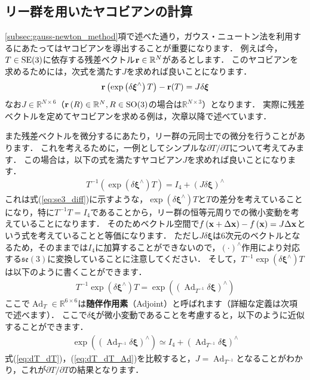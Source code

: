 \subsection{リー群を用いたヤコビアンの計算}

\ref{subsec:gauss-newton_method}項で述べた通り，ガウス・ニュートン法を利用するにあたってはヤコビアンを導出することが重要になります．
例えば今，$T \in {\rm SE}(3)$に依存する残差ベクトル${\bf r} \in \mathbb{R}^{N}$があるとします．
このヤコビアンを求めるためには，次式を満たす$J$を求めれば良いことになります．
%
\begin{align}
  {\bf r} \left( \exp \left( \delta \boldsymbol \xi^{\wedge} \right) T \right) - {\bf r}(T)
= J \delta \boldsymbol \xi
\end{align}
%
なお$J \in \mathbb{R}^{N \times 6}$（${\bf r}\left( R \right) \in \mathbb{R}^{N}, R \in {\rm SO}(3)$の場合は$\mathbb{R}^{N \times 3}$）となります．
実際に残差ベクトルを定めてヤコビアンを求める例は，次章以降で述べています．

また残差ベクトルを微分するにあたり，リー群の元同士での微分を行うことがあります．
これを考えるために，一例としてシンプルな$\partial T / \partial T$について考えてみます．
この場合は，以下の式を満たすヤコビアン$J$を求めれば良いことになります．
%
\begin{align}
  T^{-1} \left( \exp \left( \delta \boldsymbol \xi^{\wedge} \right) T \right) = I_{4} + \left( J \delta \boldsymbol \xi \right)^{\wedge}
  \label{eq:dT_dT}
\end{align}
%
これは式(\ref{eq:se3_diff})に示すような，$\exp \left( \delta \boldsymbol \xi^{\wedge} \right) T$と$T$の差分を考えていることになり，特に$T^{-1} T = I_{4}$であることから，リー群の恒等元周りでの微小変動を考えていることになります．
そのためベクトル空間で$f \left( {\bf x} + \Delta {\bf x} \right) - f \left( {\bf x} \right) = J \Delta {\bf x}$という式を考えていることと等価になります．
ただし$J \delta \boldsymbol \xi$は6次元のベクトルとなるため，そのままでは$I_{4}$に加算することができないので，$\left( \cdot \right)^{\wedge}$作用により対応する$\mathfrak{se}(3)$に変換していることに注意してください．
そして，$T^{-1} \exp \left( \delta \boldsymbol \xi^{\wedge} \right) T$は以下のように書くことができます．
%
\begin{align}
  T^{-1} \exp \left( \delta \boldsymbol \xi^{\wedge} \right) T = \exp \left( \left( \operatorname{Ad}_{T^{-1}} \delta \boldsymbol \xi \right)^{\wedge} \right)
\end{align}
%
ここで$\operatorname{Ad}_{T} \in \mathbb{R}^{6 \times 6}$は{\bf 随伴作用素}（Adjoint）と呼ばれます（詳細な定義は次項で述べます）．
ここで$\delta \boldsymbol \xi$が微小変動であることを考慮すると，以下のように近似することができます．
%
\begin{align}
  \exp \left( \left( \operatorname{Ad}_{T^{-1}} \delta \boldsymbol \xi \right)^{\wedge} \right) \simeq I_{4} + \left( \operatorname{Ad}_{T^{-1}} \delta \boldsymbol \xi \right)^{\wedge}
  \label{eq:dT_dT_Ad}
\end{align}
%
式(\ref{eq:dT_dT})，(\ref{eq:dT_dT_Ad})を比較すると，$J = \operatorname{Ad}_{T^{-1}}$となることがわかり，これが$\partial T / \partial T$の結果となります．







